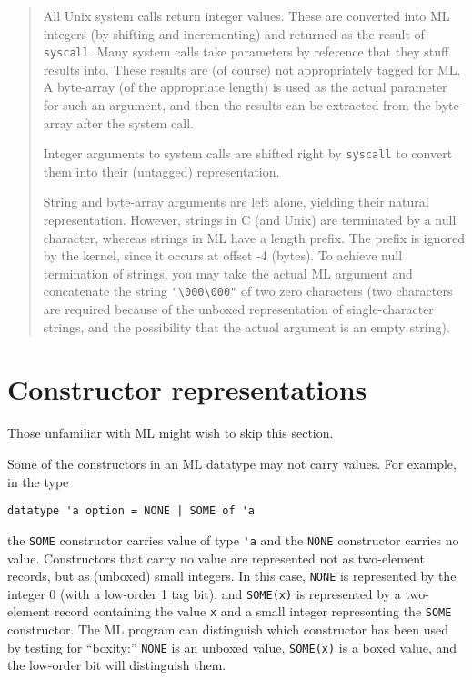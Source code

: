 \begin{quotation}
{\small All Unix system calls return integer values.  These are
converted into ML integers (by shifting and incrementing) and returned
as the result of \verb"syscall".  Many system calls take parameters
by reference that they stuff results into.  These results are (of course)
not appropriately tagged for ML.  A byte-array (of the
appropriate length) is used 
as the actual parameter for such an argument, and then
the results can be extracted from the byte-array after the system call.

Integer arguments to system calls are shifted right by \verb"syscall"
to convert them into their (untagged) representation.

String and byte-array arguments are left alone, yielding their natural
representation.  However, strings
in C (and Unix) are terminated
by a null character, whereas strings in ML have a length prefix.
The prefix is ignored by the kernel, since it occurs at offset -4 (bytes).
To achieve null termination of strings, you may take the actual ML argument
and concatenate the string \verb|"\000\000"| of two zero characters (two
characters are required because of the unboxed representation of
single-character strings, and the possibility that the actual argument
is an empty string).
}
\end{quotation}
\section{Constructor representations}
\label{constructor}
Those unfamiliar with ML might wish to skip this section.

Some of the constructors
in an ML datatype may not carry values.
For example, in the type
\begin{verbatim}
datatype 'a option = NONE | SOME of 'a
\end{verbatim}
the \verb"SOME" constructor carries value of type \verb"'a"
and the
\verb"NONE" constructor carries no value.  Constructors that carry no value
are represented not as two-element records, but as (unboxed) small integers.
In this case, \verb"NONE"
is represented by the integer 0 (with a low-order 1 tag bit),
and \verb"SOME(x)" is represented by a two-element record containing the value
\verb"x" and a small integer representing the \verb"SOME" constructor.
The ML program can distinguish which constructor has been used by
testing for ``boxity:''
 \verb"NONE" is an unboxed value, \verb"SOME(x)"
is a boxed value,
and the low-order bit will distinguish them.

